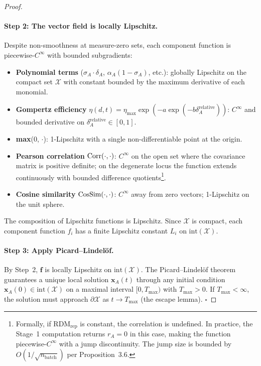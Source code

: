 \begin{proof}
\paragraph{Step 2: The vector field is locally Lipschitz.}
Despite non-smoothness at measure-zero sets, each component function is
piecewise-$C^\infty$ with bounded subgradients:
\begin{itemize}[nosep]
\item \textbf{Polynomial terms} ($\sigma_A \cdot \delta_A$, $\alpha_A(1-\sigma_A)$,
  etc.): globally Lipschitz on the compact set $\mathcal{X}$ with constant
  bounded by the maximum derivative of each monomial.
\item \textbf{Gompertz efficiency} $\eta(d,t) = \eta_{\max} \exp(-a \exp(-b \delta_A^{\text{relative}}))$:
  $C^\infty$ and bounded derivative on $\delta_A^{\text{relative}} \in [0,1]$.
\item \textbf{max}(0, $\cdot$): 1-Lipschitz with a single non-differentiable
  point at the origin.
\item \textbf{Pearson correlation} $\operatorname{Corr}(\cdot, \cdot)$: $C^\infty$ on
  the open set where the covariance matrix is positive definite; on the
  degenerate locus the function extends continuously with bounded
  difference quotients\footnote{Formally, if $\text{RDM}_{\text{rep}}$ is
  constant, the correlation is undefined. In practice, the Stage~1
  computation returns $r_A = 0$ in this case, making the function
  piecewise-$C^\infty$ with a jump discontinuity. The jump size is
  bounded by $O(1/\sqrt{n_{\text{batch}}})$ per Proposition~3.6.}.
\item \textbf{Cosine similarity} $\operatorname{CosSim}(\cdot,\cdot)$: $C^\infty$ away
  from zero vectors; 1-Lipschitz on the unit sphere.
\end{itemize}
The composition of Lipschitz functions is Lipschitz. Since $\mathcal{X}$
is compact, each component function $f_i$ has a finite Lipschitz constant
$L_i$ on $\text{int}(\mathcal{X})$.

\paragraph{Step 3: Apply Picard--Lindelöf.}
By Step~2, $\mathbf{f}$ is locally Lipschitz on $\text{int}(\mathcal{X})$.
The Picard--Lindelöf theorem guarantees a unique local solution
$\mathbf{x}_A(t)$ through any initial condition $\mathbf{x}_A(0) \in
\text{int}(\mathcal{X})$ on a maximal interval $[0, T_{\max})$ with
$T_{\max} > 0$. If $T_{\max} < \infty$, the solution must approach
$\partial\mathcal{X}$ as $t \to T_{\max}$ (the escape lemma).
$\square$
\end{proof}

